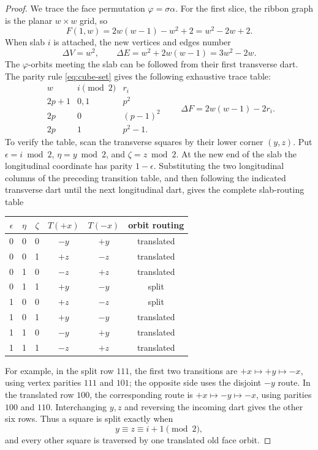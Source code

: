 \documentclass[11pt]{article}
\begin{document}
\begin{proof}
We trace the face permutation \(\varphi=\sigma\alpha\).  For the first slice,
the ribbon graph is the planar \(w\times w\) grid, so
\[
 F(1,w)=2w(w-1)-w^2+2=w^2-2w+2.
\]
When slab \(i\) is attached, the new vertices and edges number
\[
 \Delta V=w^2,\qquad
 \Delta E=w^2+2w(w-1)=3w^2-2w.
\]
The \(\varphi\)-orbits meeting the slab can be followed from their first
transverse dart.  The parity rule \eqref{eq:cube-set} gives the following
exhaustive trace table:
\[
\begin{array}{c|c|c}
 w& i\pmod2&r_i\\ \hline
 2p+1&0,1&p^2\\
 2p&0&(p-1)^2\\
 2p&1&p^2-1.
\end{array}
\qquad
\Delta F=2w(w-1)-2r_i.                              \tag{*}
\]
To verify the table, scan the transverse squares by their lower corner
\((y,z)\).  Put \(\epsilon=i\bmod2\),
\(\eta=y\bmod2\), and \(\zeta=z\bmod2\).  At the new end of the slab the
longitudinal coordinate has parity \(1-\epsilon\).  Substituting the two
longitudinal columns of the preceding transition table, and then following
the indicated transverse dart until the next longitudinal dart, gives the
complete slab-routing table
\begin{center}
\begin{tabular}{ccc|cc|c}
\toprule
\(\epsilon\)&\(\eta\)&\(\zeta\)&\(T(+x)\)&\(T(-x)\)&orbit routing\\
\midrule
0&0&0&\(-y\)&\(+y\)&translated\\
0&0&1&\(+z\)&\(-z\)&translated\\
0&1&0&\(-z\)&\(+z\)&translated\\
0&1&1&\(+y\)&\(-y\)&split\\
1&0&0&\(+z\)&\(-z\)&split\\
1&0&1&\(+y\)&\(-y\)&translated\\
1&1&0&\(-y\)&\(+y\)&translated\\
1&1&1&\(-z\)&\(+z\)&translated\\
\bottomrule
\end{tabular}
\end{center}
For example, in the split row \(111\), the first two transitions are
\(+x\mapsto+y\mapsto-x\), using vertex parities \(111\) and \(101\);
the opposite side uses the disjoint \(-y\) route.  In the translated row
\(100\), the corresponding route is
\(+x\mapsto-y\mapsto-x\), using parities \(100\) and \(110\).
Interchanging \(y,z\) and reversing the incoming dart gives the other six
rows.  Thus a square is split exactly when
\begin{equation}\label{eq:split-parity}
 y\equiv z\equiv i+1\pmod2,
\end{equation}
and every other square is traversed by one translated old face orbit.


\end{proof}
\end{document}

